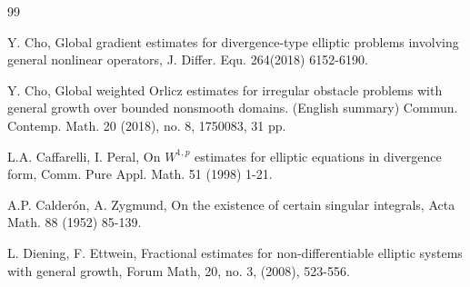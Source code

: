 \documentclass[10pt,a4paper]{article}
\theoremstyle{definition}
\numberwithin{equation}{section}
\begin{document}
\begin{thebibliography}{99}

 Y. Cho,  Global gradient estimates for divergence-type elliptic problems involving general nonlinear operators, J. Differ. Equ. 264(2018) 6152-6190.

 Y. Cho, Global weighted Orlicz estimates for irregular obstacle problems with general growth over bounded nonsmooth domains. (English summary)
Commun. Contemp. Math. 20 (2018), no. 8, 1750083, 31 pp.





 L.A. Caffarelli, I. Peral, On $W^{1,p}$ estimates for elliptic equations in divergence form, Comm. Pure Appl. Math. 51 (1998) 1-21.

 A.P. Calderón, A. Zygmund, On the existence of certain singular integrals, Acta Math. 88 (1952) 85-139.

 L. Diening, F. Ettwein, Fractional estimates for non-differentiable elliptic systems with general growth, Forum Math,  20, no. 3, (2008), 523-556.





\end{thebibliography}
\end{document}
